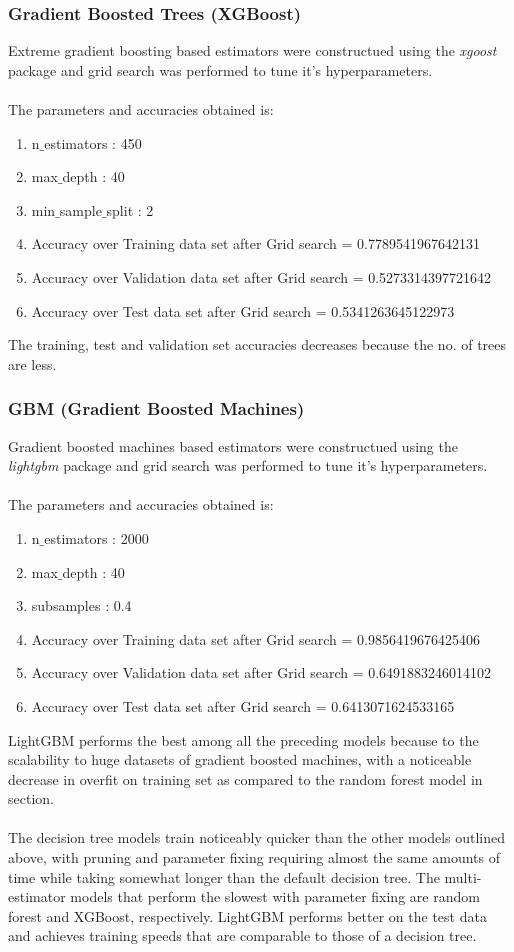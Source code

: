\documentclass[11pt]{article}
\begin{document}
\subsubsection{Gradient Boosted Trees (XGBoost)}
Extreme gradient boosting based estimators were constructued using the \textit{xgoost} package and grid search was performed to tune it's hyperparameters. \\
\\
The parameters and accuracies obtained is:
\begin{enumerate}
\item n$\_$estimators : 450
\item max$\_$depth : 40
\item min$\_$sample$\_$split : 2
\item Accuracy over Training data set after Grid search = 0.7789541967642131
\item Accuracy over Validation data set after Grid search = 0.5273314397721642
\item Accuracy over Test data set after Grid search = 0.5341263645122973
\end{enumerate}
The training, test and validation set accuracies decreases because the no. of trees are less.
\subsubsection{GBM (Gradient Boosted Machines)}
Gradient boosted machines based estimators were constructued using the \textit{lightgbm} package and grid search was performed to tune it's hyperparameters.\\
\\
The parameters and accuracies obtained is:
\begin{enumerate}
\item n$\_$estimators : 2000
\item max$\_$depth : 40
\item subsamples : 0.4
\item Accuracy over Training data set after Grid search = 0.9856419676425406
\item Accuracy over Validation data set after Grid search = 0.6491883246014102
\item Accuracy over Test data set after Grid search = 0.6413071624533165
\end{enumerate}
LightGBM performs the best among all the preceding models because to the scalability to huge datasets of gradient boosted machines, with a noticeable decrease in overfit on training set as compared to the random forest model in section.\\
\\
The decision tree models train noticeably quicker than the other models outlined above, with pruning and parameter fixing requiring almost the same amounts of time while taking somewhat longer than the default decision tree. The multi-estimator models that perform the slowest with parameter fixing are random forest and XGBoost, respectively. LightGBM performs better on the test data and achieves training speeds that are comparable to those of a decision tree.
\end{document}
